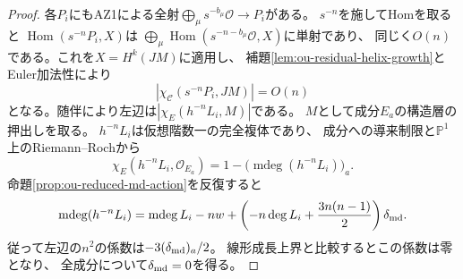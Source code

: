 \begin{proof}
各$P_i$にもAZ1による全射$\bigoplus_\mu s^{-b_\mu}\mathcal O\to P_i$がある。
$s^{-n}$を施してHomを取ると
$\operatorname{Hom}(s^{-n}P_i,X)$は
$\bigoplus_\mu\operatorname{Hom}(s^{-n-b_\mu}\mathcal O,X)$に単射であり、
同じく$O(n)$である。これを$X=H^k(JM)$に適用し、
補題\ref{lem:ou-residual-helix-growth}とEuler加法性により
\[
 |\chi_\mathcal C(s^{-n}P_i,JM)|=O(n)
\]
となる。随伴により左辺は$|\chi_E(h^{-n}L_i,M)|$である。
$M$として成分$E_a$の構造層の押出しを取る。
$h^{-n}L_i$は仮想階数一の完全複体であり、
成分への導来制限と$\mathbb P^1$上のRiemann--Rochから
\[
 \chi_E(h^{-n}L_i,\mathcal O_{E_a})
 =1-\bigl(\operatorname{mdeg}(h^{-n}L_i)\bigr)_a .
\]
命題\ref{prop:ou-reduced-md-action}を反復すると
\[
 \operatorname{mdeg}(h^{-n}L_i)
 =\operatorname{mdeg} L_i-nw+
       \left(-n\deg L_i+\frac{3n(n-1)}2\right)\delta_{\rm md}.
\]
従って左辺の$n^2$の係数は$-3(\delta_{\rm md})_a/2$。
線形成長上界と比較するとこの係数は零となり、
全成分について$\delta_{\rm md}=0$を得る。
\end{proof}

